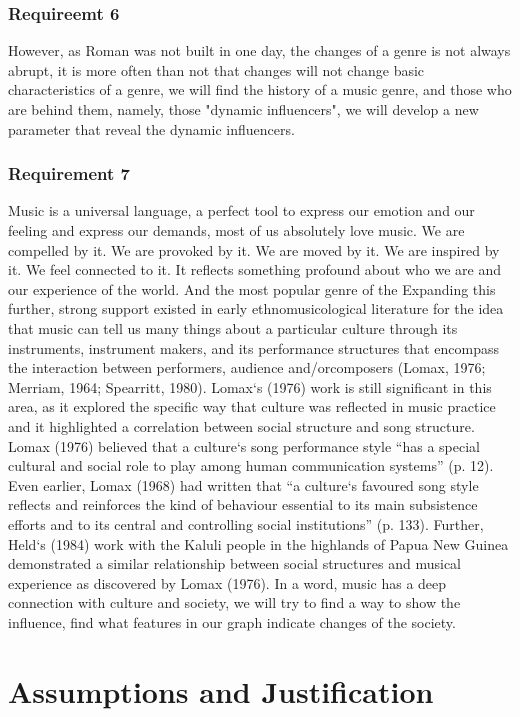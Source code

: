 \documentclass{article}
\begin{document}
\subsubsection{Requireemt 6}
However, as Roman was not built in one day, the changes of a genre is not always abrupt, it is more often than not that changes will not change basic characteristics of
a genre, we will find the history of a music genre, and those who are behind them, namely, those "dynamic influencers", we will develop a new parameter
that reveal the dynamic influencers.
\subsubsection{Requirement 7}
Music is a universal language, a perfect tool to express our emotion and our feeling and express our demands, most of us absolutely love music. We are compelled by it. We are provoked by it.
We are moved by it. We are inspired by it. We feel connected to it. It reflects something profound about who we are and our experience of the world. And the most popular
genre of the Expanding this further, strong support existed in early ethnomusicological literature for the idea that music can tell us many things about a particular culture through its instruments,
instrument makers, and its performance structures that encompass the interaction between performers, audience and/orcomposers (Lomax, 1976; Merriam, 1964; Spearritt, 1980). Lomax`s (1976) work is still
significant in this area, as it explored the specific way that culture was reflected in music practice and it highlighted a correlation between social structure and
song structure. Lomax (1976) believed that a culture`s song performance style “has a special cultural and social role to play among human communication systems” (p. 12).
Even earlier, Lomax (1968) had written that “a culture`s favoured song style reflects and reinforces the kind of behaviour essential to its main subsistence efforts and
to its central and controlling social institutions” (p. 133). Further, Held`s (1984) work with
the Kaluli people in the highlands of Papua New Guinea demonstrated a similar relationship between social structures and musical experience as discovered by Lomax (1976).
In a word, music has a deep connection with culture and society, we will try to find a way to show the influence, find what features in our graph indicate changes of the
society.
\section{Assumptions and Justification}
\end{document}
